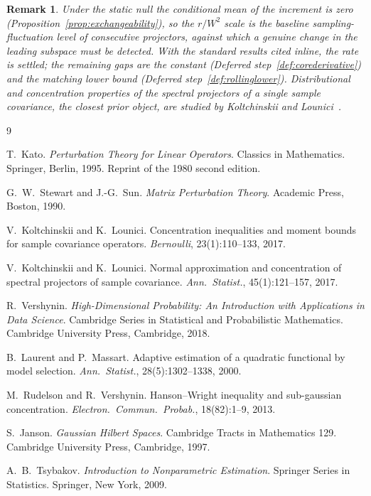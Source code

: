 \documentclass[11pt]{article}
\theoremstyle{tightplain}
\theoremstyle{tightdef}
\newtheorem{remark}[theorem]{Remark}
\begin{document}
\begin{remark}
Under the static null the conditional mean of the increment is zero
(Proposition~\ref{prop:exchangeability}), so the $r/W^2$ scale is the baseline
sampling-fluctuation level of consecutive projectors, against which a genuine change
in the leading subspace must be detected. With the standard results cited inline, the
rate is settled; the remaining gaps are the constant
(Deferred step~\ref{def:corederivative}) and the matching lower bound
(Deferred step~\ref{def:rollinglower}). Distributional and concentration properties of
the spectral projectors of a single sample covariance, the closest prior object, are
studied by Koltchinskii and Lounici~\cite{klproj}.
\end{remark}

\begin{thebibliography}{9}

 T.~Kato. \emph{Perturbation Theory for Linear Operators}. Classics in
Mathematics. Springer, Berlin, 1995. Reprint of the 1980 second edition.

 G.~W.~Stewart and J.-G.~Sun. \emph{Matrix Perturbation Theory}.
Academic Press, Boston, 1990.

 V.~Koltchinskii and K.~Lounici. Concentration inequalities and moment
bounds for sample covariance operators. \emph{Bernoulli}, 23(1):110--133, 2017.

 V.~Koltchinskii and K.~Lounici. Normal approximation and
concentration of spectral projectors of sample covariance. \emph{Ann.\ Statist.},
45(1):121--157, 2017.

 R.~Vershynin. \emph{High-Dimensional Probability: An Introduction
with Applications in Data Science}. Cambridge Series in Statistical and Probabilistic
Mathematics. Cambridge University Press, Cambridge, 2018.

 B.~Laurent and P.~Massart. Adaptive estimation of a quadratic
functional by model selection. \emph{Ann.\ Statist.}, 28(5):1302--1338, 2000.

 M.~Rudelson and R.~Vershynin. Hanson--Wright inequality and
sub-gaussian concentration. \emph{Electron.\ Commun.\ Probab.}, 18(82):1--9, 2013.

 S.~Janson. \emph{Gaussian Hilbert Spaces}. Cambridge Tracts in
Mathematics 129. Cambridge University Press, Cambridge, 1997.

 A.~B.~Tsybakov. \emph{Introduction to Nonparametric Estimation}.
Springer Series in Statistics. Springer, New York, 2009.

\end{thebibliography}
\end{document}
